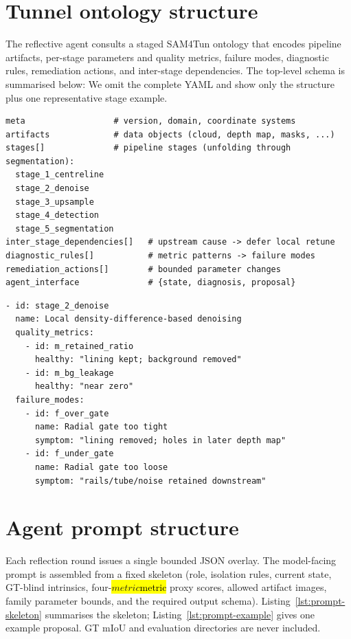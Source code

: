 \documentclass[a4paper,fleqn]{cas-dc}
\let\texthl\hl
\renewcommand{\hl}[1]{\ifmmode\colorbox{yellow}{\ensuremath{#1}}\else\texthl{#1}\fi}
\begin{document}
\section{Tunnel ontology structure}\label{app:ontology}

The reflective agent consults a staged SAM4Tun ontology that encodes pipeline
artifacts, per-stage parameters and quality metrics, failure modes, diagnostic
rules, remediation actions, and inter-stage dependencies. The top-level schema
is summarised below:
We omit the complete YAML and show only the structure plus one representative
stage example.

\begin{lstlisting}[caption={Ontology top-level keys and stage inventory.},label={lst:ontology-structure}]
meta                  # version, domain, coordinate systems
artifacts             # data objects (cloud, depth map, masks, ...)
stages[]              # pipeline stages (unfolding through segmentation):
  stage_1_centreline
  stage_2_denoise
  stage_3_upsample
  stage_4_detection
  stage_5_segmentation
inter_stage_dependencies[]   # upstream cause -> defer local retune
diagnostic_rules[]           # metric patterns -> failure modes
remediation_actions[]        # bounded parameter changes
agent_interface              # {state, diagnosis, proposal}
\end{lstlisting}

\begin{lstlisting}[caption={Example ontology stage: radial denoising failure modes.},label={lst:ontology-example}]
- id: stage_2_denoise
  name: Local density-difference-based denoising
  quality_metrics:
    - id: m_retained_ratio
      healthy: "lining kept; background removed"
    - id: m_bg_leakage
      healthy: "near zero"
  failure_modes:
    - id: f_over_gate
      name: Radial gate too tight
      symptom: "lining removed; holes in later depth map"
    - id: f_under_gate
      name: Radial gate too loose
      symptom: "rails/tube/noise retained downstream"
\end{lstlisting}

\section{Agent prompt structure}\label{app:prompt}

Each reflection round issues a single bounded JSON overlay. The model-facing
prompt is assembled from a fixed skeleton (role, isolation rules, current
state, GT-blind intrinsics, four-\hl{metric} proxy scores, allowed artifact images,
family parameter bounds, and the required output schema). Listing~\ref{lst:prompt-skeleton}
summarises the skeleton; Listing~\ref{lst:prompt-example} gives one example
proposal. GT mIoU and evaluation directories are never included.
\end{document}
